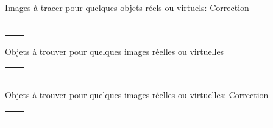 \documentclass{article}
\newcommand{\titre}[1]{\hfil{\Large #1}}
\begin{document}
\titre{Images \`a tracer pour quelques objets r\'eels ou virtuels: Correction}
\begin{tabular}{|c|c|}
\hline
&\\ \hline
&\\ \hline
&\\ \hline
&\\ \hline
\end{tabular}


\newpage

\titre{Objets \`a trouver pour quelques images r\'eelles ou virtuelles}
\begin{tabular}{|c|c|}
\hline
&\\ \hline
&\\ \hline
&\\ \hline
&\\ \hline
\end{tabular}


\newpage


\titre{Objets \`a trouver pour quelques images r\'eelles ou virtuelles: Correction}
\begin{tabular}{|c|c|}
\hline
&\\ \hline
&\\ \hline
&\\ \hline
&\\ \hline
\end{tabular}
\end{document}
